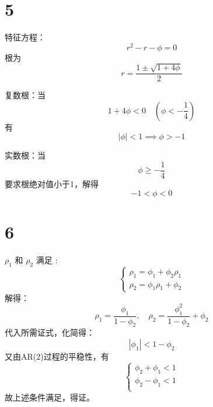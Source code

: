 \documentclass{article}
\begin{document}
\section*{5}    
特征方程：
\[
r^2 - r - \phi = 0
\]
根为
\[
r = \frac{1 \pm \sqrt{1 + 4\phi}}{2}
\]

复数根：当
\[
1 + 4\phi < 0 \quad (\phi < -\frac{1}{4})
\]
有
\[
|\phi| < 1 \implies \phi > -1
\]

实数根：当
\[
\phi \geq -\frac{1}{4}
\]
要求根绝对值小于1，解得
\[
-1 < \phi < 0
\]

\section*{6}

$\rho_1$ 和 $\rho_2$ 满足 :
\[
\begin{cases}
\rho_1 = \phi_1 + \phi_2 \rho_1 \\
\rho_2 = \phi_1 \rho_1 + \phi_2
\end{cases}
\]
解得：
\[
\rho_1 = \frac{\phi_1}{1 - \phi_2}, \quad \rho_2 = \frac{\phi_1^2}{1 - \phi_2} + \phi_2
\]
代入所需证式，化简得：
\[
|\phi_1| < 1 - \phi_2
\]
又由AR(2)过程的平稳性，有
\[
\begin{cases}
\phi_2 + \phi_1 < 1 \\
\phi_2 - \phi_1 < 1 \\
\end{cases}
\]
故上述条件满足，得证。
\end{document}
